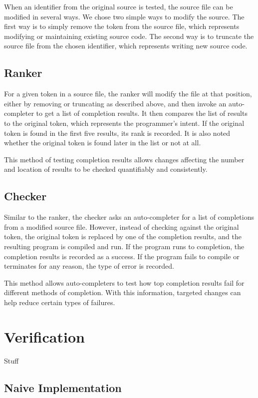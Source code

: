 \documentclass[ms,electronic,twosidetoc,letterpaper,chaptercenter,parttop,lol,lof,lot]{byumsphd}
\begin{document}
When an identifier from the original source is tested, the source file can be modified in several ways. We chose two simple ways to modify the source. The first way is to simply remove the token from the source file, which represents modifying or maintaining existing source code. The second way is to truncate the source file from the chosen identifier, which represents writing new source code.

\section{Ranker}

For a given token in a source file, the ranker will modify the file at that position, either by removing or truncating as described above, and then invoke an auto-completer to get a list of completion results. It then compares the list of results to the original token, which represents the programmer's intent. If the original token is found in the first five results, its rank is recorded. It is also noted whether the original token is found later in the list or not at all.

This method of testing completion results allows changes affecting the number and location of results to be checked quantifiably and consistently.

\section{Checker}

Similar to the ranker, the checker asks an auto-completer for a list of completions from a modified source file. However, instead of checking against the original token, the original token is replaced by one of the completion results, and the resulting program is compiled and run. If the program runs to completion, the completion results is recorded as a success. If the program fails to compile or terminates for any reason, the type of error is recorded.

This method allows auto-completers to test how top completion results fail for different methods of completion. With this information, targeted changes can help reduce certain types of failures.

\chapter{Verification}

Stuff

\section{Naive Implementation}
\end{document}
